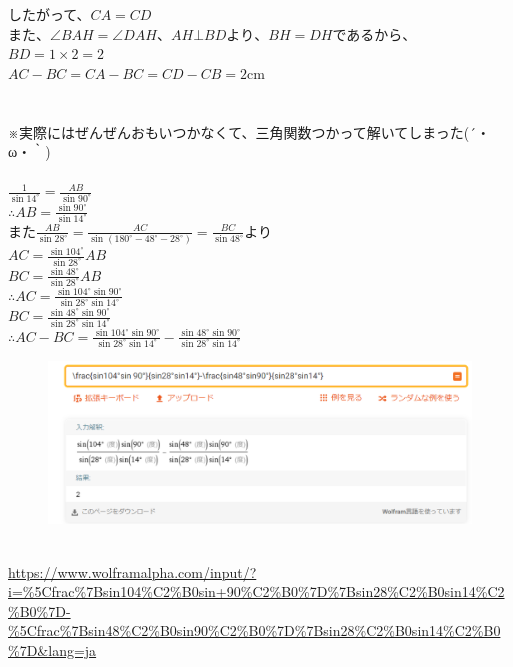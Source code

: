 \documentclass[fleqn]{jsarticle}
\begin{document}
	したがって、$CA=CD$\\
	また、$\angle{BAH}=\angle{DAH}、AH⊥BDより、BH=DH$であるから、$BD=1\times 2=2$\\
	$AC-BC=CA-BC=CD-CB=2$cm\\
	\\
	\vspace{5cm}
	\\
	※実際にはぜんぜんおもいつかなくて、三角関数つかって解いてしまった(´・ω・｀)\\
	\\
	$\frac{1}{\sin 14^\circ}=\frac{AB}{\sin 90^\circ}$\\
	$\therefore AB=\frac{\sin 90^\circ}{\sin 14^\circ}$\\
	また$\frac{AB}{\sin 28^\circ}=\frac{AC}{\sin (180^\circ-48^\circ-28^\circ)}=\frac{BC}{\sin 48^\circ}$より\\
	$AC=\frac{\sin 104^\circ}{\sin 28^\circ}AB$\\
	$BC=\frac{\sin 48^\circ}{\sin 28^\circ}AB$\\
	$\therefore AC=\frac{\sin 104^\circ \sin 90^\circ}{\sin 28^\circ \sin 14^\circ}$\\
	$BC=\frac{\sin 48^\circ \sin 90^\circ}{\sin 28^\circ \sin 14^\circ}$\\
	$\therefore AC-BC=\frac{\sin 104^\circ \sin 90^\circ}{\sin 28^\circ \sin 14^\circ}-\frac{\sin 48^\circ \sin 90^\circ}{\sin 28^\circ \sin 14^\circ}$\\
	\begin{figure}[h]
		\includegraphics[width=14cm]{./2020-05-05-102216.png}
	\end{figure}\\
	\href{https://www.wolframalpha.com/input/?i=\%5Cfrac\%7Bsin104\%C2\%B0sin+90\%C2\%B0\%7D\%7Bsin28\%C2\%B0sin14\%C2\%B0\%7D-\%5Cfrac\%7Bsin48\%C2\%B0sin90\%C2\%B0\%7D\%7Bsin28\%C2\%B0sin14\%C2\%B0\%7D\&lang=ja}{https://www.wolframalpha.com/input/?i=\%5Cfrac\%7Bsin104\%C2\%B0sin+90\%C2\%B0\%7D\%7Bsin28\%C2\%B0sin14\%C2\%B0\%7D-\%5Cfrac\%7Bsin48\%C2\%B0sin90\%C2\%B0\%7D\%7Bsin28\%C2\%B0sin14\%C2\%B0\%7D\&lang=ja}
\end{document}
